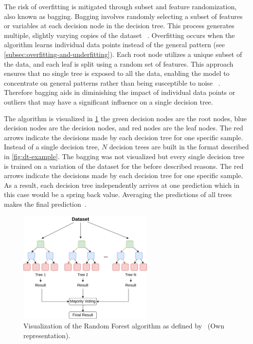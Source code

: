 {The risk of overfitting is mitigated through subset and feature randomization, also known as bagging.
Bagging involves randomly selecting a subset of features or variables at each decision node in the decision
tree.
This process generates multiple, slightly varying copies of the dataset
~\cite[p. 341]{gareth2013introduction}.
Overfitting occurs when the algorithm learns individual data points instead of
the general pattern (see \cref{subsec:overfitting-and-underfitting}).
Each root node utilizes a unique subset of the data, and each leaf is split using a random set of features.
This approach ensures that no single tree is exposed to all the data, enabling the model to concentrate on general
patterns rather than being susceptible to noise
~\cite[p. 83]{muller_introductionmachinelearning_2016}.
Therefore bagging aids in diminishing the impact of individual data points or outliers that may have a
significant influence on a single decision tree.

The algorithm is visualized in \cref{fig:rf-example} the green decision nodes are the root nodes, blue decision nodes
are the decision nodes, and red nodes are the leaf nodes.
The red arrows indicate the decisions made by each decision tree for one specific sample.
Instead of a single decision tree, $N$ decision trees are built in the format described in \cref{fig:dt-example}.
The bagging was not visualized but every single decision tree is trained on a variation of the dataset for the before
described reasons.
The red arrows indicate the decisions made by each decision tree for one specific sample.
As a result, each decision tree independently arrives at one prediction which in this case would be a spring back value.
Averaging the predictions of all trees makes the final prediction~\cite[p. 9]{breiman_randomforests_2001}.

\begin{figure}[h]
    \begin{tcolorbox}[arc=0pt,boxrule=0.5pt]
        \centering
        \includegraphics[width=0.6\textwidth]{chap4/images/random_forest_example}
    \end{tcolorbox}
    \caption{Visualization of the Random Forest algorithm as defined by~\cite[p.1]{breiman_randomforests_2001} (Own
    representation).
    }
    \label{fig:rf-example}
\end{figure}

}
